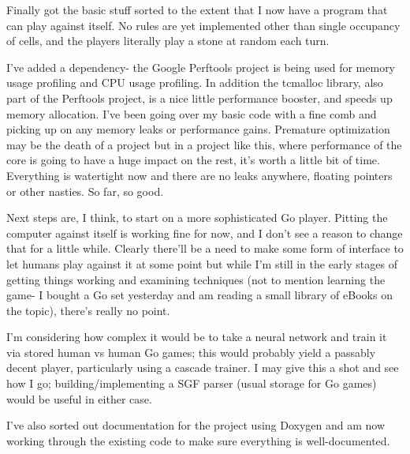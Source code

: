 \documentclass[a4paper,12pt]{article}
\begin{document}
Finally got the basic stuff sorted to the extent that I now have a program that can play against itself. No rules are yet implemented other than single occupancy of cells, and the players literally play a stone at random each turn.

I've added a dependency- the Google Perftools project is being used for memory usage profiling and CPU usage profiling. In addition the tcmalloc library, also part of the Perftools project, is a nice little performance booster, and speeds up memory allocation. I've been going over my basic code with a fine comb and picking up on any memory leaks or performance gains. Premature optimization may be the death of a project but in a project like this, where performance of the core is going to have a huge impact on the rest, it's worth a little bit of time. Everything is watertight now and there are no leaks anywhere, floating pointers or other nasties. So far, so good.

Next steps are, I think, to start on a more sophisticated Go player. Pitting the computer against itself is working fine for now, and I don't see a reason to change that for a little while. Clearly there'll be a need to make some form of interface to let humans play against it at some point but while I'm still in the early stages of getting things working and examining techniques (not to mention learning the game- I bought a Go set yesterday and am reading a small library of eBooks on the topic), there's really no point. 

I'm considering how complex it would be to take a neural network and train it via stored human vs human Go games; this would probably yield a passably decent player, particularly using a cascade trainer. I may give this a shot and see how I go; building/implementing a SGF parser (usual storage for Go games) would be useful in either case.

I've also sorted out documentation for the project using Doxygen and am now working through the existing code to make sure everything is well-documented.
\end{document}
